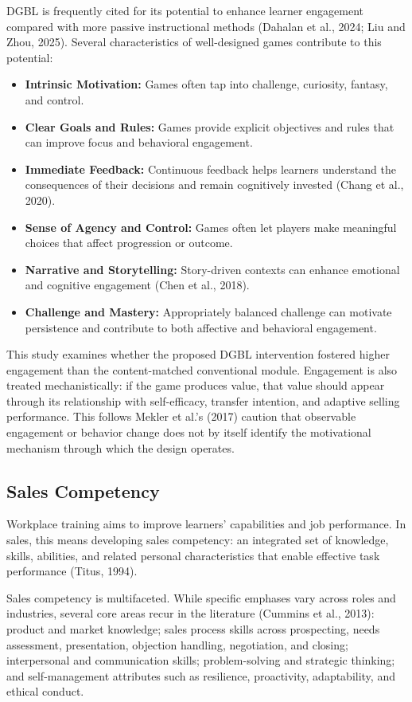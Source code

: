 \documentclass[12pt]{report}
\begin{document}
DGBL is frequently cited for its potential to enhance learner engagement compared with more passive instructional methods (Dahalan et al., 2024; Liu and Zhou, 2025). Several characteristics of well-designed games contribute to this potential:

\begin{itemize}[leftmargin=1.2cm]
    \item \textbf{Intrinsic Motivation:} Games often tap into challenge, curiosity, fantasy, and control.
    \item \textbf{Clear Goals and Rules:} Games provide explicit objectives and rules that can improve focus and behavioral engagement.
    \item \textbf{Immediate Feedback:} Continuous feedback helps learners understand the consequences of their decisions and remain cognitively invested (Chang et al., 2020).
    \item \textbf{Sense of Agency and Control:} Games often let players make meaningful choices that affect progression or outcome.
    \item \textbf{Narrative and Storytelling:} Story-driven contexts can enhance emotional and cognitive engagement (Chen et al., 2018).
    \item \textbf{Challenge and Mastery:} Appropriately balanced challenge can motivate persistence and contribute to both affective and behavioral engagement.
\end{itemize}

This study examines whether the proposed DGBL intervention fostered higher engagement than the content-matched conventional module. Engagement is also treated mechanistically: if the game produces value, that value should appear through its relationship with self-efficacy, transfer intention, and adaptive selling performance. This follows Mekler et al.'s (2017) caution that observable engagement or behavior change does not by itself identify the motivational mechanism through which the design operates.

\subsection{Sales Competency}
Workplace training aims to improve learners' capabilities and job performance. In sales, this means developing sales competency: an integrated set of knowledge, skills, abilities, and related personal characteristics that enable effective task performance (Titus, 1994).

Sales competency is multifaceted. While specific emphases vary across roles and industries, several core areas recur in the literature (Cummins et al., 2013): product and market knowledge; sales process skills across prospecting, needs assessment, presentation, objection handling, negotiation, and closing; interpersonal and communication skills; problem-solving and strategic thinking; and self-management attributes such as resilience, proactivity, adaptability, and ethical conduct.
\end{document}
